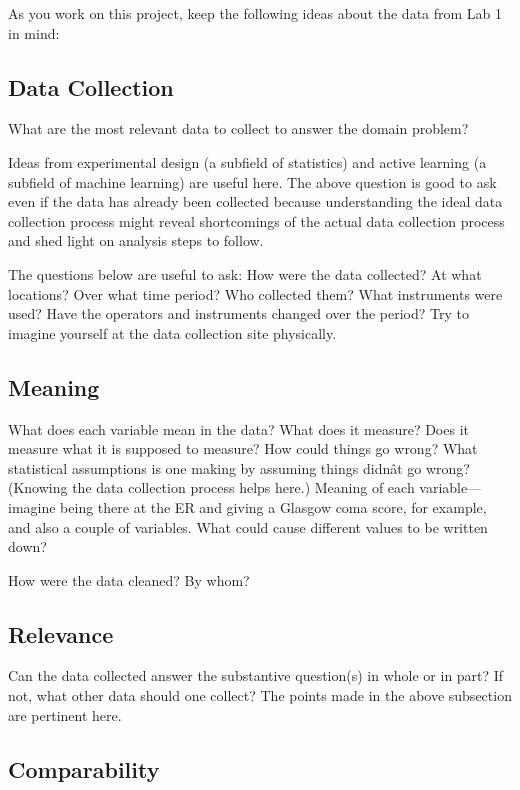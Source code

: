 \documentclass[letterpaper,12pt]{article}
\begin{document}
As you work on this project, keep the following ideas about the data from Lab 1 in mind:

\subsection*{Data Collection}

What are the most relevant data to collect to answer the domain problem?

Ideas from experimental design (a subfield of statistics) and active learning (a subfield of machine learning) are useful here. The above question is good to ask even if the data has already been collected because understanding the ideal data collection process might reveal shortcomings of the actual data collection process and shed light on analysis steps to follow.

The questions below are useful to ask: How were the data collected? At what locations? Over what time period? Who collected them? What instruments were used? Have the operators and instruments changed over the period? Try to imagine yourself at the data collection site physically.

\subsection*{Meaning}

What does each variable mean in the data? What does it measure? Does it measure what it is supposed to measure? How could things go wrong? What statistical assumptions is one making by assuming things didnât go wrong? (Knowing the data collection process helps here.) Meaning of each variable---imagine being there at the ER and giving a Glasgow coma score, for example, and also a couple of variables. What could cause different values to be written down?

How were the data cleaned? By whom?

\subsection*{Relevance}

Can the data collected answer the substantive question(s) in whole or in part? If not, what other data should one collect? The points made in the above subsection are pertinent here.

\subsection*{Comparability}
\end{document}
